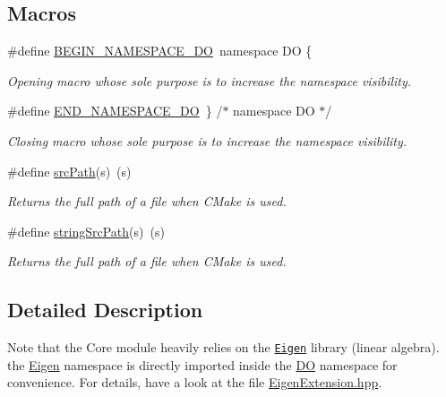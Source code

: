 \subsection*{Macros}
\begin{DoxyCompactItemize}
\item 
\hypertarget{group___core_ga6befbca3f4c07866e5a0b6b255b6a469}{\#define \hyperlink{group___core_ga6befbca3f4c07866e5a0b6b255b6a469}{B\-E\-G\-I\-N\-\_\-\-N\-A\-M\-E\-S\-P\-A\-C\-E\-\_\-\-D\-O}~namespace D\-O \{}\label{group___core_ga6befbca3f4c07866e5a0b6b255b6a469}

\begin{DoxyCompactList}\small\item\em Opening macro whose sole purpose is to increase the namespace visibility. \end{DoxyCompactList}\item 
\hypertarget{group___core_gace84578be62b4659157bfae5b1e7b9f4}{\#define \hyperlink{group___core_gace84578be62b4659157bfae5b1e7b9f4}{E\-N\-D\-\_\-\-N\-A\-M\-E\-S\-P\-A\-C\-E\-\_\-\-D\-O}~\} /$\ast$ namespace D\-O $\ast$/}\label{group___core_gace84578be62b4659157bfae5b1e7b9f4}

\begin{DoxyCompactList}\small\item\em Closing macro whose sole purpose is to increase the namespace visibility. \end{DoxyCompactList}\item 
\#define \hyperlink{group___core_ga3a1adaa43f4f9abbba0e666652a3756c}{src\-Path}(s)~(s)
\begin{DoxyCompactList}\small\item\em Returns the full path of a file when C\-Make is used. \end{DoxyCompactList}\item 
\#define \hyperlink{group___core_ga6dcd6c29c77233d5b21cda46b3aad899}{string\-Src\-Path}(s)~(s)
\begin{DoxyCompactList}\small\item\em Returns the full path of a file when C\-Make is used. \end{DoxyCompactList}\end{DoxyCompactItemize}


\subsection{Detailed Description}
Note that the Core module heavily relies on the \href{http://eigen.tuxfamily.org/}{\tt Eigen} library (linear algebra). the \hyperlink{namespace_eigen}{Eigen} namespace is directly imported inside the \hyperlink{namespace_d_o}{D\-O} namespace for convenience. For details, have a look at the file \hyperlink{_eigen_extension_8hpp}{Eigen\-Extension.\-hpp}.

